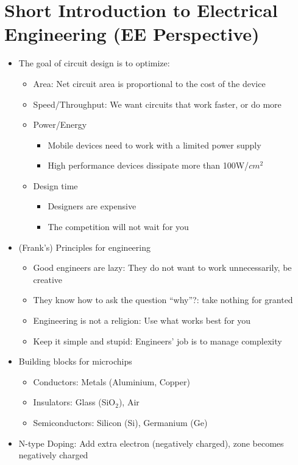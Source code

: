 \documentclass[a4paper]{article}
\begin{document}
\section{Short Introduction to Electrical Engineering (EE Perspective)}
\begin{itemize}
\item The goal of circuit design is to optimize:
\begin{itemize}
\item Area: Net circuit area is proportional to the cost of the device
\item Speed/Throughput: We want circuits that work  faster, or do more
\item Power/Energy
\begin{itemize}
\item Mobile devices need to work with a limited power supply
\item High performance devices dissipate more than 100W/$cm^2$
\end{itemize}
\item Design time
\begin{itemize}
\item Designers are expensive
\item The competition will not wait for you
\end{itemize}
\end{itemize}
\item (Frank's) Principles for engineering
\begin{itemize}
\item Good engineers are lazy: They do not want to work unnecessarily, be creative
\item They know how to ask the question ``why''?: take nothing for granted
\item Engineering is not a religion: Use what works best for you
\item Keep it simple and stupid: Engineers' job is to manage complexity
\end{itemize}
\item Building blocks for microchips
\begin{itemize}
\item Conductors: Metals (Aluminium, Copper)
\item Insulators: Glass (SiO$_2$), Air
\item Semiconductors: Silicon (Si), Germanium (Ge)
\end{itemize}
\item N-type Doping: Add extra electron (negatively charged), zone becomes negatively charged

\end{itemize}
\end{document}

